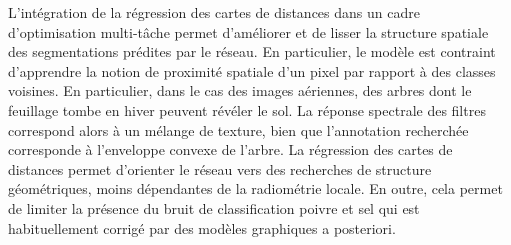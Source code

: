 L'intégration de la régression des cartes de distances dans un cadre d'optimisation multi-tâche permet d'améliorer et de lisser la structure spatiale des segmentations prédites par le réseau. En particulier, le modèle est contraint d'apprendre la notion de proximité spatiale d'un pixel par rapport à des classes voisines. En particulier, dans le cas des images aériennes, des arbres dont le feuillage tombe en hiver peuvent révéler le sol. La réponse spectrale des filtres correspond alors à un mélange de texture, bien que l'annotation recherchée corresponde à l'enveloppe convexe de l'arbre. La régression des cartes de distances permet d'orienter le réseau vers des recherches de structure géométriques, moins dépendantes de la radiométrie locale. En outre, cela permet de limiter la présence du bruit de classification poivre et sel qui est habituellement corrigé par des modèles graphiques a posteriori.

%
%
\printbibliography
